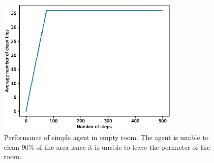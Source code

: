 \documentclass{article}
\begin{document}
\begin{figure}[h!]
  \centering

  \includegraphics[width=0.8\textwidth]{SimpleNoWallPerformance}
  \caption{Performance of simple agent in empty room. The agent is unable to clean 90\% of the area isnce it is unable to leave the perimeter of the room. }
  \label{fig:SimpleNoWall}
\end{figure}
\end{document}
